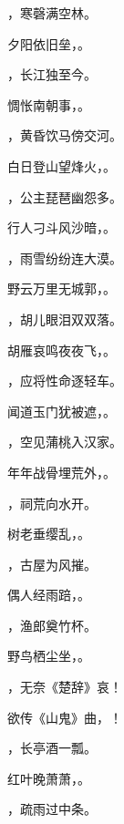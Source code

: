 \documentclass[12pt, a4paper, addpoints]{exam}
\begin{document}
\begin{questions}
\question[1] \uline{\qquad\qquad\qquad}，寒磬满空林。

\question[1] 夕阳依旧垒，\uline{\qquad\qquad\qquad}。

\question[1] \uline{\qquad\qquad\qquad}，长江独至今。

\question[1] 惆怅南朝事，\uline{\qquad\qquad\qquad}。

\question[1] \uline{\qquad\qquad\qquad}，黄昏饮马傍交河。

\question[1] 白日登山望烽火，\uline{\qquad\qquad\qquad}。

\question[1] \uline{\qquad\qquad\qquad}，公主琵琶幽怨多。

\question[1] 行人刁斗风沙暗，\uline{\qquad\qquad\qquad}。

\question[1] \uline{\qquad\qquad\qquad}，雨雪纷纷连大漠。

\question[1] 野云万里无城郭，\uline{\qquad\qquad\qquad}。

\question[1] \uline{\qquad\qquad\qquad}，胡儿眼泪双双落。

\question[1] 胡雁哀鸣夜夜飞，\uline{\qquad\qquad\qquad}。

\question[1] \uline{\qquad\qquad\qquad}，应将性命逐轻车。

\question[1] 闻道玉门犹被遮，\uline{\qquad\qquad\qquad}。

\question[1] \uline{\qquad\qquad\qquad}，空见蒲桃入汉家。

\question[1] 年年战骨埋荒外，\uline{\qquad\qquad\qquad}。

\question[1] \uline{\qquad\qquad\qquad}，祠荒向水开。

\question[1] 树老垂缨乱，\uline{\qquad\qquad\qquad}。

\question[1] \uline{\qquad\qquad\qquad}，古屋为风摧。

\question[1] 偶人经雨踣，\uline{\qquad\qquad\qquad}。

\question[1] \uline{\qquad\qquad\qquad}，渔郎奠竹杯。

\question[1] 野鸟栖尘坐，\uline{\qquad\qquad\qquad}。

\question[1] \uline{\qquad\qquad\qquad}，无奈《楚辞》哀！

\question[1] 欲传《山鬼》曲，\uline{\qquad\qquad\qquad}！

\question[1] \uline{\qquad\qquad\qquad}，长亭酒一瓢。

\question[1] 红叶晚萧萧，\uline{\qquad\qquad\qquad}。

\question[1] \uline{\qquad\qquad\qquad}，疏雨过中条。


\end{questions}
\end{document}
